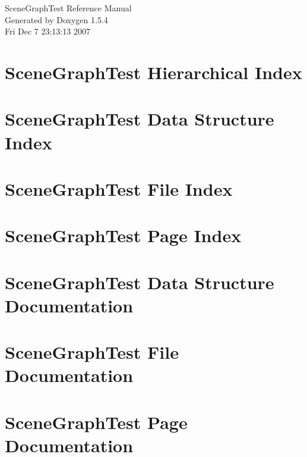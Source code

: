 \documentclass[a4paper]{book}
\begin{document}
\begin{titlepage}
\vspace*{7cm}
\begin{center}
{\Large SceneGraphTest Reference Manual}\\
\vspace*{1cm}
{\large Generated by Doxygen 1.5.4}\\
\vspace*{0.5cm}
{\small Fri Dec 7 23:13:13 2007}\\
\end{center}
\end{titlepage}
\clearemptydoublepage
{}
\tableofcontents
\clearemptydoublepage
{}
\chapter{SceneGraphTest Hierarchical Index}

\chapter{SceneGraphTest Data Structure Index}

\chapter{SceneGraphTest File Index}

\chapter{SceneGraphTest Page Index}

\chapter{SceneGraphTest Data Structure Documentation}




\chapter{SceneGraphTest File Documentation}











\chapter{SceneGraphTest Page Documentation}

\printindex
\end{document}
